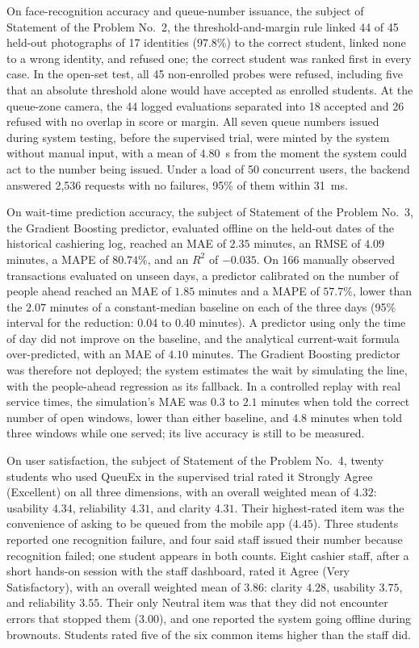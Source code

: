 \documentclass{research}
\newcommand{\sysname}{QueuEx}
\begin{document}
On face-recognition accuracy and queue-number issuance, the subject of
Statement of the Problem No.~2, the threshold-and-margin rule linked 44
of 45 held-out photographs of 17 identities ($97.8\%$) to the correct
student, linked none to a wrong identity, and refused one; the correct
student was ranked first in every case. In the open-set test, all 45
non-enrolled probes were refused, including five that an absolute
threshold alone would have accepted as enrolled students. At the
queue-zone camera, the 44 logged evaluations separated into 18 accepted
and 26 refused with no overlap in score or margin. All seven queue
numbers issued during system testing, before the supervised trial, were
minted by the system without manual input, with a mean of $4.80$~s from
the moment the system could act to the number being issued. Under a load
of 50 concurrent users, the backend answered 2,536 requests with no
failures, 95\% of them within 31~ms.

On wait-time prediction accuracy, the subject of Statement of the
Problem No.~3, the Gradient Boosting predictor, evaluated offline on the
held-out dates of the historical cashiering log, reached an MAE of
$2.35$ minutes, an RMSE of $4.09$ minutes, a MAPE of $80.74\%$, and an
$R^2$ of $-0.035$. On 166 manually observed transactions evaluated on
unseen days, a predictor calibrated on the number of people ahead
reached an MAE of $1.85$ minutes and a MAPE of $57.7\%$, lower than the
$2.07$ minutes of a constant-median baseline on each of the three days
(95\% interval for the reduction: 0.04 to 0.40 minutes). A predictor
using only the time of day did not improve on the baseline, and the
analytical current-wait formula over-predicted, with an MAE of $4.10$
minutes. The Gradient Boosting predictor was therefore not deployed; the
system estimates the wait by simulating the line, with the people-ahead
regression as its fallback. In a controlled replay with real service
times, the simulation's MAE was $0.3$ to $2.1$ minutes when told the
correct number of open windows, lower than either baseline, and $4.8$
minutes when told three windows while one served; its live accuracy is
still to be measured.

On user satisfaction, the subject of Statement of the Problem No.~4,
twenty students who used \sysname{} in the supervised trial rated it
Strongly Agree (Excellent) on all three dimensions, with an overall
weighted mean of $4.32$: usability $4.34$, reliability $4.31$, and
clarity $4.31$. Their highest-rated item was the convenience of asking
to be queued from the mobile app ($4.45$). Three students reported one
recognition failure, and four said staff issued their number because
recognition failed; one student appears in both counts. Eight cashier
staff, after a short hands-on session with the staff dashboard, rated
it Agree (Very Satisfactory), with an overall weighted mean of $3.86$:
clarity $4.28$, usability $3.75$, and reliability $3.55$. Their only
Neutral item was that they did not encounter errors that stopped them
($3.00$), and one reported the system going offline during brownouts.
Students rated five of the six common items higher than the staff did.
\end{document}

